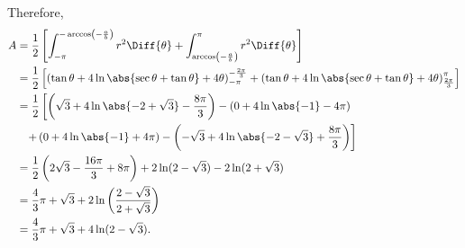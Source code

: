 \begin{enumerate}
          Therefore,
          \begin{align*}
              A & = \frac{1}{2}\left[\int_{-\pi}^{-\arccos\left(-\frac{a}{b}\right)} r^2 \Diff{\theta} + \int_{\arccos\left(-\frac{a}{b}\right)}^{\pi} r^2 \Diff{\theta}\right]                                                        \\
                & = \frac{1}{2} \left[\left(\tan\theta + 4\ln\abs{\sec\theta+\tan\theta} + 4\theta\right)^{-\frac{2\pi}{3}}_{-\pi} + \left(\tan\theta + 4\ln\abs{\sec\theta+\tan\theta} + 4\theta\right)^{\pi}_{\frac{2\pi}{3}}\right] \\
                & = \frac{1}{2} \left[\left(\sqrt{3} + 4\ln\abs{-2+\sqrt{3}} - \frac{8\pi}{3}\right) - \left(0 + 4\ln\abs{-1} - 4\pi\right)\right.                                                                                     \\
                & \phantom{=} \left.+ \left(0 + 4\ln\abs{-1} + 4\pi\right) - \left(-\sqrt{3} + 4\ln\abs{-2-\sqrt{3}} + \frac{8\pi}{3}\right)\right]                                                                                    \\
                & = \frac{1}{2} \left(2\sqrt{3} - \frac{16\pi}{3} + 8\pi\right) + 2\ln(2 - \sqrt{3}) - 2\ln(2 + \sqrt{3})                                                                                                              \\
                & = \frac{4}{3}\pi + \sqrt{3} + 2\ln\left(\frac{2 - \sqrt{3}}{2 + \sqrt{3}}\right)                                                                                                                                     \\
                & = \frac{4}{3}\pi + \sqrt{3} + 4\ln(2 - \sqrt{3}).
          \end{align*}
\end{enumerate}